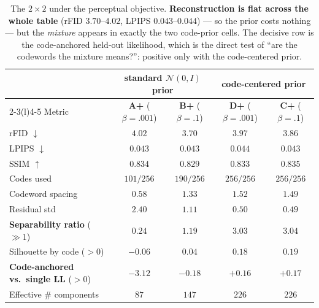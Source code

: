 \documentclass[11pt]{article}
\newcommand{\good}[1]{\textcolor{green!55!black}{#1}}
\newcommand{\bad}[1]{\textcolor{red!70!black}{#1}}
\begin{document}
\begin{table}[h]
\centering
\caption{The $2\times2$ under the perceptual objective. \textbf{Reconstruction is flat across the
whole table} (rFID $3.70$--$4.02$, LPIPS $0.043$--$0.044$) --- so the prior costs nothing --- but
the \emph{mixture} appears in exactly the two code-prior cells. The decisive row is the
code-anchored held-out likelihood, which is the direct test of ``are the codewords the mixture
means?'': positive only with the code-centered prior.}
\label{tab:twobytwo}
\small
\begin{tabular}{lcccc}
\toprule
 & \multicolumn{2}{c}{standard $\mathcal{N}(0,I)$ prior} & \multicolumn{2}{c}{code-centered prior}\\
\cmidrule(r){2-3}\cmidrule(l){4-5}
Metric & \textbf{A+} ($\beta{=}.001$) & \textbf{B+} ($\beta{=}.1$) & \textbf{D+} ($\beta{=}.001$) & \textbf{C+} ($\beta{=}.1$)\\
\midrule
rFID $\downarrow$                & $4.02$ & $3.70$ & $3.97$ & $3.86$\\
LPIPS $\downarrow$               & $0.043$ & $0.043$ & $0.044$ & $0.043$\\
SSIM $\uparrow$                  & $0.834$ & $0.829$ & $0.833$ & $0.835$\\
\midrule
Codes used                       & \bad{$101/256$} & $190/256$ & \good{$256/256$} & \good{$256/256$}\\
Codeword spacing                 & $0.58$ & $1.33$ & $1.52$ & $1.49$\\
Residual std                     & \bad{$2.40$} & $1.11$ & \good{$0.50$} & \good{$0.49$}\\
\textbf{Separability ratio} ($\gg1$) & \bad{$0.24$} & \bad{$1.19$} & \good{$3.03$} & \good{$3.04$}\\
Silhouette by code ($>0$)        & \bad{$-0.06$} & $0.04$ & \good{$0.18$} & \good{$0.19$}\\
\textbf{Code-anchored vs.\ single LL} ($>0$) & \bad{$-3.12$} & \bad{$-0.18$} & \good{$+0.16$} & \good{$+0.17$}\\
Effective \# components          & $87$ & $147$ & $226$ & $226$\\
\bottomrule
\end{tabular}
\end{table}
\end{document}
